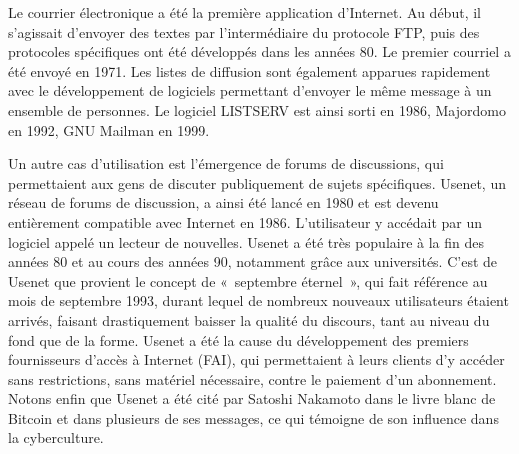\clearpage
Le courrier électronique a été la première application d'Internet. Au début, il s'agissait d'envoyer des textes par l'intermédiaire du protocole FTP, puis des protocoles spécifiques ont été développés dans les années 80. Le premier courriel a été envoyé en 1971. Les listes de diffusion sont également apparues rapidement avec le développement de logiciels permettant d'envoyer le même message à un ensemble de personnes. Le logiciel LISTSERV est ainsi sorti en 1986, Majordomo en 1992, GNU Mailman en 1999.

Un autre cas d'utilisation est l'émergence de forums de discussions, qui permettaient aux gens de discuter publiquement de sujets spécifiques. Usenet, un réseau de forums de discussion, a ainsi été lancé en 1980 et est devenu entièrement compatible avec Internet en 1986. L'utilisateur y accédait par un logiciel appelé un lecteur de nouvelles. Usenet a été très populaire à la fin des années 80 et au cours des années 90, notamment grâce aux universités. C'est de Usenet que provient le concept de «~septembre éternel~», qui fait référence au mois de septembre 1993, durant lequel de nombreux nouveaux utilisateurs étaient arrivés, faisant drastiquement baisser la qualité du discours, tant au niveau du fond que de la forme. Usenet a été la cause du développement des premiers fournisseurs d'accès à Internet (FAI), qui permettaient à leurs clients d'y accéder sans restrictions, sans matériel nécessaire, contre le paiement d'un abonnement. Notons enfin que Usenet a été cité par Satoshi Nakamoto dans le livre blanc de Bitcoin et dans plusieurs de ses messages, ce qui témoigne de son influence dans la cyberculture. %

